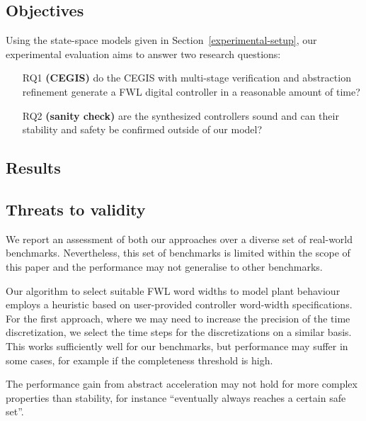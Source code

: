 \documentclass[runningheads,a4paper]{llncs}
\begin{document}
\subsection{Objectives}

Using the state-space models given in Section~\ref{experimental-setup}, 
our experimental evaluation aims to answer two research questions:
%
\begin{enumerate}

\item[RQ1] \textbf{(CEGIS)} do the CEGIS with multi-stage 
verification and abstraction refinement generate a FWL digital 
controller in a reasonable amount of time?

\item[RQ2] \textbf{(sanity check)} are the synthesized controllers sound
and can their stability and safety be confirmed outside of our model?

\end{enumerate}


\subsection{Results}


\subsection{Threats to validity}
We report an assessment of both our approaches over a diverse set of real-world benchmarks. Nevertheless, this set of benchmarks is limited within the scope of this paper and the performance may not generalise to other benchmarks. 

Our algorithm to select suitable FWL word widths to model plant behaviour employs a heuristic based on user-provided controller word-width specifications. For the first approach, where we may need to increase the precision of the time discretization, we select the time steps for the discretizations on a similar basis. This works sufficiently well for our benchmarks, but performance may suffer in some cases, for example if the completeness threshold is high. 

The performance gain from abstract acceleration may not hold for more complex properties than stability, for instance ``eventually always reaches a certain safe set''. 
\end{document}
